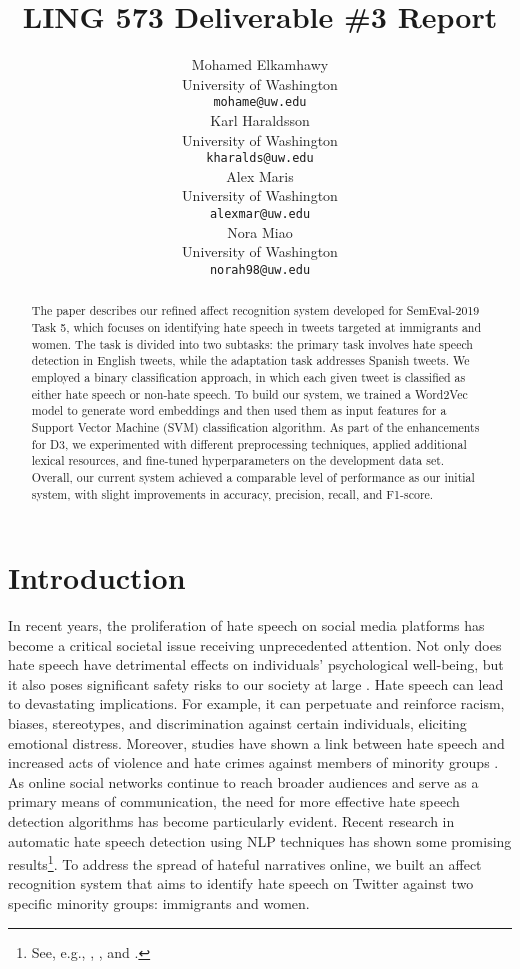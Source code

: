 \documentclass[11pt,a4paper]{article}
\title{LING 573 Deliverable \#3 Report}
\author{Mohamed Elkamhawy \\
  \small University of Washington \\
  \texttt{mohame@uw.edu} \\\And
  Karl Haraldsson \\
  \small University of Washington \\
  \texttt{kharalds@uw.edu} \\\And
  Alex Maris \\
  \small University of Washington \\
  \texttt{alexmar@uw.edu} \\\And
  Nora Miao \\
  \small University of Washington \\
  \texttt{norah98@uw.edu} \\
  }
\date{}
\begin{document}
\maketitle
\begin{abstract}
The paper describes our refined affect recognition system developed for SemEval-2019 Task 5, which focuses on identifying hate speech in tweets targeted at immigrants and women. The task is divided into two subtasks: the primary task involves hate speech detection in English tweets, while the adaptation task addresses Spanish tweets. We employed a binary classification approach, in which each given tweet is classified as either hate speech or non-hate speech. To build our system, we trained a Word2Vec model to generate word embeddings and then used them as input features for a Support Vector Machine (SVM) classification algorithm. As part of the enhancements for D3, we experimented with different preprocessing techniques, applied additional lexical resources, and fine-tuned hyperparameters on the development data set. Overall, our current system achieved a comparable level of performance as our initial system, with slight improvements in accuracy, precision, recall, and F1-score.


\end{abstract}

\section{Introduction}
    In recent years, the proliferation of hate speech on social media platforms has become a critical societal issue receiving unprecedented attention. Not only does hate speech have detrimental effects on individuals’ psychological well-being, but it also poses significant safety risks to our society at large \citep{saha2019prevalence}. Hate speech can lead to devastating implications. For example, it can perpetuate and reinforce racism, biases, stereotypes, and discrimination against certain individuals, eliciting emotional distress. Moreover, studies have shown a link between hate speech and increased acts of violence and hate crimes against members of minority groups \citep{relia2019race}. As online social networks continue to reach broader audiences and serve as a primary means of communication, the need for more effective hate speech detection algorithms has become particularly evident. Recent research in automatic hate speech detection using NLP techniques has shown some promising results\footnote{See, e.g., \citet{asogwa2022hate},  \citet{kotarcic2023humanintheloop}, and \citet{schmidt-wiegand-2017-survey}.}. To address the spread of hateful narratives online, we built an affect recognition system that aims to identify hate speech on Twitter against two specific minority groups: immigrants and women.
    
\end{document}
